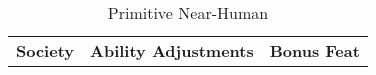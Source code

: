

\begin{table}[ht]
\caption{Primitive Near-Human}
\begin{adjustbox}{width=\columnwidth,center}
\begin{tabular}{l l l}
\textbf{Society} &\textbf{Ability Adjustments} & \textbf{Bonus Feat}\\


\end{tabular}
\end{adjustbox}
\end{table}
